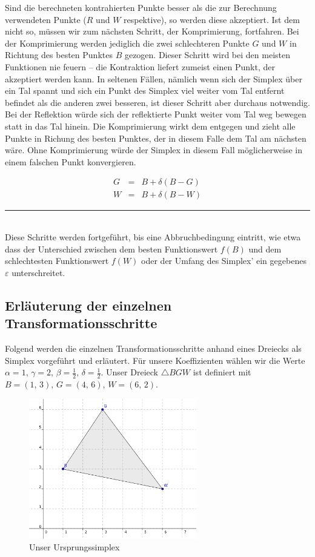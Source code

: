 \documentclass[naustrian]{article}
\begin{document}
Sind die berechneten kontrahierten Punkte besser als die zur Berechnung
verwendeten Punkte ($R$ und $W$ respektive), so werden diese akzeptiert.  Ist
dem nicht so, müssen wir zum nächsten Schritt, der Komprimierung, fortfahren.
Bei der Komprimierung werden jediglich die zwei schlechteren Punkte $G$ und $W$
in Richtung des besten Punktes $B$ gezogen. \cite{nelder-mead-scholarpedia}
Dieser Schritt wird bei den meisten Funktionen nie feuern -- die Kontraktion
liefert zumeist einen Punkt, der akzeptiert werden kann. In seltenen Fällen,
nämlich wenn sich der Simplex über ein Tal spannt und sich ein Punkt des
Simplex viel weiter vom Tal entfernt befindet als die anderen zwei besseren,
ist dieser Schritt aber durchaus notwendig.
Bei der Reflektion würde sich der reflektierte Punkt weiter vom Tal weg bewegen
statt in das Tal hinein. Die Komprimierung wirkt dem entgegen und zieht alle
Punkte in Richung des besten Punktes, der in diesem Falle dem Tal am nächsten
wäre. Ohne Komprimierung würde der Simplex in diesem Fall möglicherweise in
einem falschen Punkt konvergieren.

\begin{eqnarray*}
    G & = & B+\delta(B-G)\\
    W & = & B+\delta(B-W)
\end{eqnarray*}
\rule[0.5ex]{1\columnwidth}{0.5pt}\\

Diese Schritte werden fortgeführt, bis eine Abbruchbedingung eintritt, wie etwa
dass der Unterschied zwischen dem besten Funktionswert $f(B)$ und dem
schlechtesten Funktionswert $f(W)$ oder der Umfang des Simplex' ein gegebenes
$\varepsilon$ unterschreitet.

\subsection{Erläuterung der einzelnen Transformationsschritte}

Folgend werden die einzelnen Transformationsschritte anhand eines
Dreiecks als Simplex vorgeführt und erläutert. Für unsere Koeffizienten
wählen wir die Werte $\alpha=1,\,\gamma=2,\,\beta=\frac{1}{2},\,\delta=\frac{1}{2}$.
Unser Dreieck $\triangle BGW$ ist definiert mit $B=(1,\,3),\,G=(4,\,6),\,W=(6,\,2)$.

\begin{figure}[H]
    \centering
    \includegraphics[width=0.65\textwidth]{nelder_mead/triangle_bgw}
    \caption{Unser Ursprungssimplex}
\end{figure}
\end{document}
